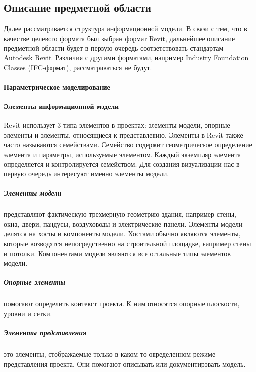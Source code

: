 ﻿\subsection{Описание предметной области}

Далее рассматривается структура информационной модели.
В связи с тем, что в качестве целевого формата был выбран  формат Revit,
дальнейшее описание предметной области будет в первую очередь
соответствовать стандартам Autodesk Revit.
Различия с другими форматами, например Industry Foundation Classes (IFC-формат),%
\cite{BuildingSmartIFC}
рассматриваться не будут.

\paragraph{Параметрическое моделирование}

\lipsum[4]

\paragraph{Элементы информационной модели}

Revit использует 3 типа элементов в проектах:
элементы модели, опорные элементы и элементы, относящиеся к представлению.
Элементы в Revit также часто называются семействами.
Семейство содержит геометрическое определение элемента и
параметры, используемые элементом.
Каждый экземпляр элемента определяется и контролируется семейством.%
\cite{DocRevit}
Для создания визуализации нас в первую очередь интересуют
именно элементы модели.

\subparagraph{Элементы модели}

представляют фактическую трехмерную геометрию здания,
например стены, окна, двери, пандусы,
воздуховоды и электрические панели.
Элементы модели делятся на хосты и компоненты модели.
Хостами обычно являются элементы,
которые возводятся непосредственно на строительной площадке,
например стены и потолки.
Компонентами модели являются все остальные типы элементов модели.

\subparagraph{Опорные элементы}

помогают определить контекст проекта.
К ним относятся опорные плоскости, уровни и сетки.

\subparagraph{Элементы представления}

это элементы, отображаемые только в каком-то определенном режиме представления проекта.
Они помогают описывать или документировать модель.

